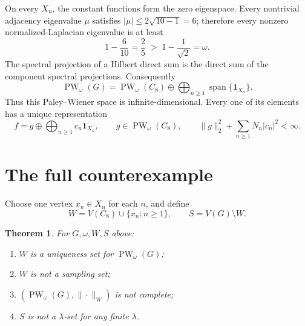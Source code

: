 \documentclass[11pt]{article}
\newtheorem{theorem}{Theorem}
\newcommand{\PW}{\operatorname{PW}}
\newcommand{\one}{\mathbf 1}
\begin{document}
On every \(X_n\), the constant functions form the zero eigenspace.  Every
nontrivial adjacency eigenvalue \(\mu\) satisfies
\(|\mu|\le2\sqrt{10-1}=6\); therefore every nonzero normalized-Laplacian
eigenvalue is at least
\[
  1-\frac6{10}=\frac25
  \;>\;1-\frac1{\sqrt2}=\omega.
\]
The spectral projection of a Hilbert direct sum is the direct sum of the
component spectral projections.  Consequently
\begin{equation}\label{eq:PW}
 \PW_\omega(G)
 =\PW_\omega(C_8)\oplus
   \bigoplus_{n\ge1}\operatorname{span}\{\one_{X_n}\}.
\end{equation}
Thus this Paley--Wiener space is infinite-dimensional.  Every one of its
elements has a unique representation
\begin{equation}\label{eq:representation}
 f=g\oplus\bigoplus_{n\ge1}c_n\one_{X_n},\qquad
 g\in\PW_\omega(C_8),\qquad
 \|g\|_2^2+\sum_{n\ge1}N_n|c_n|^2<\infty.
\end{equation}

\section{The full counterexample}

Choose one vertex \(x_n\in X_n\) for each \(n\), and define
\[
  W=V(C_8)\cup\{x_n:n\ge1\},\qquad S=V(G)\setminus W.
\]

\begin{theorem}\label{thm:main}
For \(G,\omega,W,S\) above:
\begin{enumerate}
 \item \(W\) is a uniqueness set for \(\PW_\omega(G)\);
 \item \(W\) is not a sampling set;
 \item \((\PW_\omega(G),\|\cdot\|_W)\) is not complete;
 \item \(S\) is not a \(\lambda\)-set for any finite \(\lambda\).
\end{enumerate}
\end{theorem}
\end{document}
